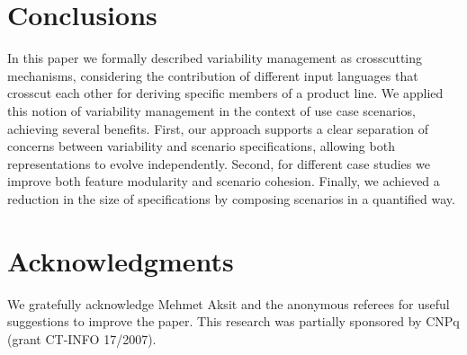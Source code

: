 \documentclass{sig-alternate}
\begin{document}
\section{Conclusions}\label{sec:conclusions}

In this paper we formally described variability management as crosscutting
mechanisms, considering the contribution of different input languages that
crosscut each other for deriving specific members of a product line. We applied
this notion of variability management in the context of use case scenarios,
achieving several benefits. First, our approach supports a clear separation of
concerns between variability and scenario specifications, allowing both
representations to evolve independently. Second, for different case studies we
improve both feature modularity and scenario cohesion. Finally, we achieved a
reduction in the size of specifications by composing scenarios in a quantified
way. 




\section{Acknowledgments}
We gratefully acknowledge Mehmet Aksit and the anonymous referees
for useful suggestions to improve the paper. This research was partially
sponsored by CNPq (grant CT-INFO 17/2007). 


%
%



%
\end{document}
